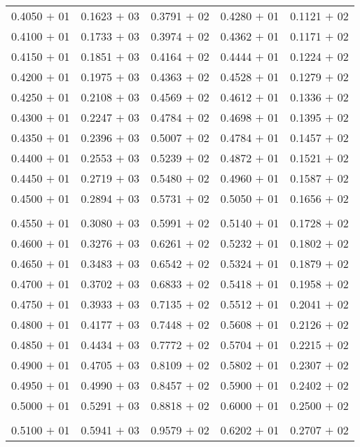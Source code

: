 \documentclass[a4paper,11pt]{article}
\begin{document}
\begin{center}
\begin{longtable}{ c c c c c }
\\
0.4050 $+$ 01 & 0.1623 $+$ 03 & 0.3791 $+$ 02 & 0.4280 $+$ 01 & 0.1121 $+$ 02 \\
0.4100 $+$ 01 & 0.1733 $+$ 03 & 0.3974 $+$ 02 & 0.4362 $+$ 01 & 0.1171 $+$ 02 \\
0.4150 $+$ 01 & 0.1851 $+$ 03 & 0.4164 $+$ 02 & 0.4444 $+$ 01 & 0.1224 $+$ 02 \\
0.4200 $+$ 01 & 0.1975 $+$ 03 & 0.4363 $+$ 02 & 0.4528 $+$ 01 & 0.1279 $+$ 02 \\
0.4250 $+$ 01 & 0.2108 $+$ 03 & 0.4569 $+$ 02 & 0.4612 $+$ 01 & 0.1336 $+$ 02 \\
0.4300 $+$ 01 & 0.2247 $+$ 03 & 0.4784 $+$ 02 & 0.4698 $+$ 01 & 0.1395 $+$ 02 \\
0.4350 $+$ 01 & 0.2396 $+$ 03 & 0.5007 $+$ 02 & 0.4784 $+$ 01 & 0.1457 $+$ 02 \\
0.4400 $+$ 01 & 0.2553 $+$ 03 & 0.5239 $+$ 02 & 0.4872 $+$ 01 & 0.1521 $+$ 02 \\
0.4450 $+$ 01 & 0.2719 $+$ 03 & 0.5480 $+$ 02 & 0.4960 $+$ 01 & 0.1587 $+$ 02 \\
0.4500 $+$ 01 & 0.2894 $+$ 03 & 0.5731 $+$ 02 & 0.5050 $+$ 01 & 0.1656 $+$ 02 \\
\\
0.4550 $+$ 01 & 0.3080 $+$ 03 & 0.5991 $+$ 02 & 0.5140 $+$ 01 & 0.1728 $+$ 02 \\
0.4600 $+$ 01 & 0.3276 $+$ 03 & 0.6261 $+$ 02 & 0.5232 $+$ 01 & 0.1802 $+$ 02 \\
0.4650 $+$ 01 & 0.3483 $+$ 03 & 0.6542 $+$ 02 & 0.5324 $+$ 01 & 0.1879 $+$ 02 \\
0.4700 $+$ 01 & 0.3702 $+$ 03 & 0.6833 $+$ 02 & 0.5418 $+$ 01 & 0.1958 $+$ 02 \\
0.4750 $+$ 01 & 0.3933 $+$ 03 & 0.7135 $+$ 02 & 0.5512 $+$ 01 & 0.2041 $+$ 02 \\
0.4800 $+$ 01 & 0.4177 $+$ 03 & 0.7448 $+$ 02 & 0.5608 $+$ 01 & 0.2126 $+$ 02 \\
0.4850 $+$ 01 & 0.4434 $+$ 03 & 0.7772 $+$ 02 & 0.5704 $+$ 01 & 0.2215 $+$ 02 \\
0.4900 $+$ 01 & 0.4705 $+$ 03 & 0.8109 $+$ 02 & 0.5802 $+$ 01 & 0.2307 $+$ 02 \\
0.4950 $+$ 01 & 0.4990 $+$ 03 & 0.8457 $+$ 02 & 0.5900 $+$ 01 & 0.2402 $+$ 02 \\
0.5000 $+$ 01 & 0.5291 $+$ 03 & 0.8818 $+$ 02 & 0.6000 $+$ 01 & 0.2500 $+$ 02 \\
\\
0.5100 $+$ 01 & 0.5941 $+$ 03 & 0.9579 $+$ 02 & 0.6202 $+$ 01 & 0.2707 $+$ 02 \\

\end{longtable}
\end{center}
\end{document}
